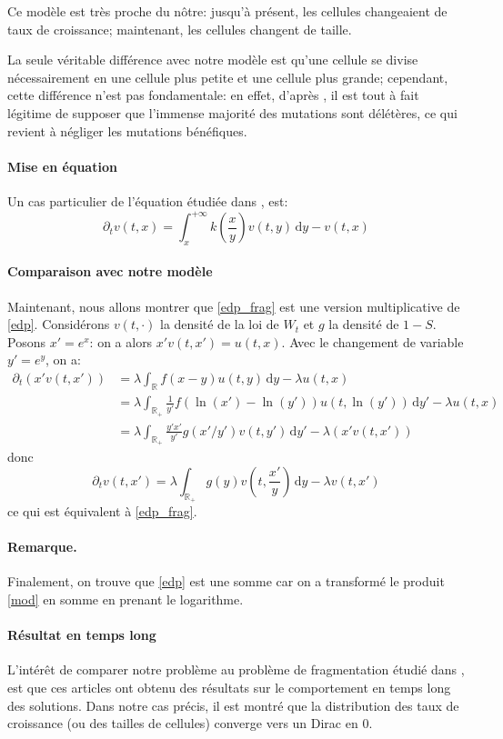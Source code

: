 \documentclass[12pt]{article}
\newcounter{thm}
\newcommand{\req}[1]{\paragraph{Remarque.}#1\vspace{0.1cm}}
\newcommand{\pth}[1]{\left(#1\right)}
\newcommand{\Er}{\mathbb{R}}
\newcommand{\de}{\,\mathrm{d}}
\newcommand{\dr}{\partial}
\begin{document}
Ce modèle est très proche du nôtre: jusqu'à présent, les cellules changeaient de taux de croissance; maintenant, les cellules changent de taille.

La seule véritable différence avec notre modèle est qu'une cellule se divise nécessairement en une cellule plus petite et une cellule plus grande; cependant, cette différence n'est pas fondamentale: en effet, d'après \cite{rob}, il est tout à fait légitime de supposer que l'immense majorité des mutations sont délétères, ce qui revient à négliger les mutations bénéfiques.

\paragraph{Mise en équation} 

Un cas particulier de l'équation étudiée dans \cite{md1}, \cite{md2} est:
\begin{equation}\label{edp_frag}
\dr_tv(t,x)=\int_x^{+\infty}k\pth{\frac{x}{y}}v(t,y)\de y-v(t,x)
\end{equation}


\paragraph{Comparaison avec notre modèle}

Maintenant, nous allons montrer que \eqref{edp_frag} est une version multiplicative de \eqref{edp}.  Considérons $v(t,\cdot)$ la densité de la loi de $W_t$ et $g$ la densité de $1-S$. Posons $x'=e^x$: on a alors $x'v(t,x')=u(t,x)$. Avec le changement de variable $y'=e^y$, on a:
\begin{align*}
  \dr_t(x'v(t,x'))
  &=\lambda\int_{\Er}f(x-y)u(t,y)\de y-\lambda u(t,x)\\
  &=\lambda\int_{\Er_+}\frac{1}{y'}f(\ln(x')-\ln(y'))u(t,\ln(y'))\de y'-\lambda u(t,x)\\
  &=\lambda\int_{\Er_+}\frac{y'x'}{y'}g(x'/y')v\pth{t,y'}\de y'-\lambda\pth{x'v(t,x')}
\end{align*}
donc 
\[\dr_tv(t,x')=\lambda\int_{\Er_+}g(y)v\pth{t,\frac{x'}{y}}\de y-\lambda v(t,x')\]
ce qui est équivalent à \eqref{edp_frag}.

\req{Finalement, on trouve que \eqref{edp} est une somme car on a transformé le produit \eqref{mod} en somme en prenant le logarithme.}


\paragraph{Résultat en temps long} L'intérêt de comparer notre problème au problème de fragmentation étudié dans \cite{md1}, \cite{md2} est que ces articles ont obtenu des résultats sur le comportement en temps long des solutions. Dans notre cas précis, il est montré que la distribution des taux de croissance (ou des tailles de cellules) converge vers un Dirac en 0. 
\end{document}
